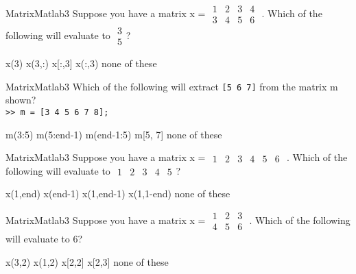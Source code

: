 \documentclass[master]{exam}
\begin{document}
\newpage


\begin{problem}{MatrixMatlab}{3}
    Suppose you have a matrix x = \footnotesize
    $\begin{array}{cccc}1 & 2 & 3 & 4\\3 & 4 & 5 & 6\end{array}$
    \normalsize. Which of the following will evaluate to \footnotesize
    $\begin{array}{c}3 \\ 5\end{array}$\normalsize?
    
  \begin{answers}
    \answer x(3)
    \answer x(3,:)
    \answer x[:,3]
    \answer[correct] x(:,3)
    \answer[fixed] none of these
  \end{answers}
\end{problem}


\begin{problem}{MatrixMatlab}{3}
    Which of the following will extract \texttt{[5 6 7]} from the matrix m
      shown?\\
    \texttt{>> m = [3 4 5 6 7 8];
    }
    
    \begin{answers}
        \answer[correct] m(3:5)
        \answer m(5:end-1)
        \answer m(end-1:5)
        \answer m[5, 7]
        \answer[fixed] none of these 
    \end{answers}
\end{problem}


\begin{problem}{MatrixMatlab}{3}
    Suppose you have a matrix x = \footnotesize
    $\begin{array}{cccccc}1 & 2 & 3 & 4 & 5 & 6 \end{array}$
    \normalsize. Which of the following will evaluate to \footnotesize
    $\begin{array}{cccccc}1 & 2 & 3 & 4 & 5 \end{array}$\normalsize?
    
    \begin{answers}
        \answer x(1,end)
        \answer x(end-1)
        \answer x(1,end-1)
        \answer x(1,1-end)
         none of these 
    \end{answers}
\end{problem}

\begin{problem}{MatrixMatlab}{3}
    Suppose you have a matrix x = \footnotesize
    $\begin{array}{ccc}1 & 2 & 3 \\4 & 5 & 6 \end{array}$
    \normalsize. Which of the following will evaluate to 6?
    
    \begin{answers}
        \answer x(3,2)
        \answer x(1,2)
        \answer x[2,2]
        \answer x[2,3]
         none of these 
    \end{answers}
\end{problem}
\end{document}
